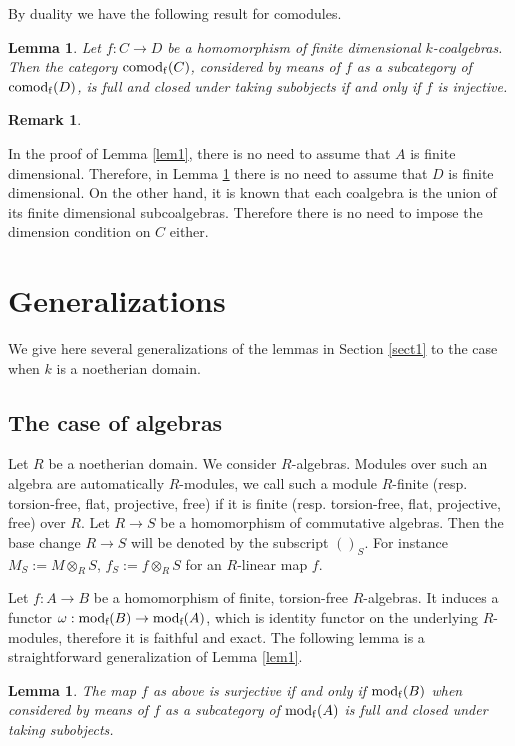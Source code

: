 \documentclass[12pt]{amsart}
\theoremstyle{plain}
\newtheorem{lem}[thm]{Lemma}
\theoremstyle{definition}
\newtheorem{rmk}[thm]{Remark}
\numberwithin{thm}{section}
\def\mod{{\rm mod}}
\def\comod{{\rm comod}}
\begin{document}
By duality we have the following result for 
comodules.

\begin{lem}\label{lem2}
Let $f:C\to D$ be a homomorphism of finite 
dimensional $k$-coalgebras. Then the category 
$\comod_{\rm f}(C)$, considered by means of $f$ as a 
subcategory of $\comod_{\rm f}(D)$, is full and closed 
under taking subobjects if and only if $f$ is 
injective.
\end{lem}



\begin{rmk}\label{rmk3}

In the proof of Lemma \ref{lem1}, there is no need to 
assume that $A$ is finite dimensional. Therefore, 
in Lemma \ref{lem2} there is no need to assume that 
$D$ is finite dimensional. On the other hand, it is 
known that each coalgebra is the union of its 
finite dimensional subcoalgebras. Therefore there is no need to impose the dimension condition on 
$C$ either.

\end{rmk}



\section{Generalizations}

We give here several generalizations of the 
lemmas in Section \ref{sect1} to the case when 
$k$ is a noetherian domain.



  \subsection{The case of algebras}     
Let $R$ be a noetherian domain. We consider $R$-algebras. Modules over such an algebra are automatically $R$-modules, we call such a module $R$-finite (resp. torsion-free, flat, projective, free) if it is finite (resp. torsion-free, flat, projective, free) over $R$. Let $R\to S$ be a homomorphism of commutative algebras. Then the base change $R\to S$ will be denoted by the subscript $( )_S$. For instance $M_S:=M\otimes_RS$, $f_S:=f\otimes_RS$ for an $R$-linear map $f$.


Let  $f:A\to B$ be a 
homomorphism of finite, torsion-free $R$-algebras. It 
induces a functor $\omega:\mod_\text{f}(B)\to 
\mod_\text{f}(A)$, which is 
identity functor on the underlying $R$-modules, 
therefore it is faithful and exact. The following lemma is a straightforward generalization of Lemma \ref{lem1}.
\begin{lem}\label{lem4} The map $f$ as above is surjective if and only if 
$\mod_{\rm f}(B)$ when considered by means of $f$
  as a subcategory of $\mod_{\rm f}(A)$ is full and closed 
under taking subobjects.
\end{lem}
\end{document}
